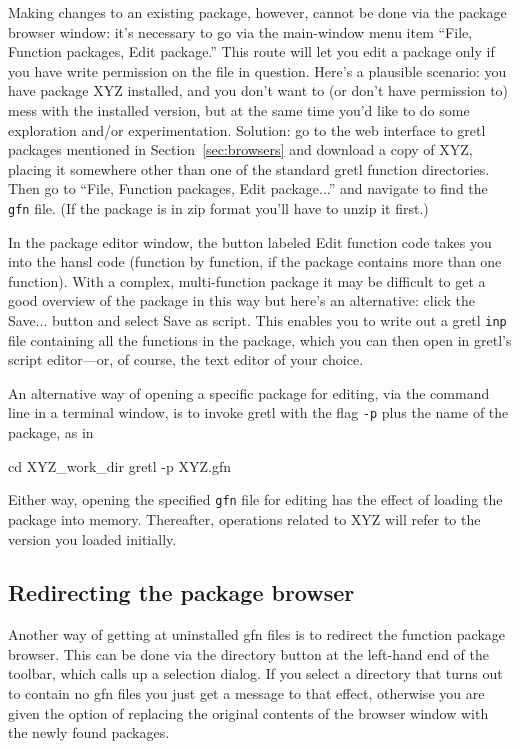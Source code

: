 \documentclass[oneside]{book}
\begin{document}
Making changes to an existing package, however, cannot be done via the
package browser window: it's necessary to go via the main-window menu
item ``File, Function packages, Edit package.'' This route will let
you edit a package only if you have write permission on the file in
question.  Here's a plausible scenario: you have package \textsf{XYZ}
installed, and you don't want to (or don't have permission to) mess
with the installed version, but at the same time you'd like to do some
exploration and/or experimentation. Solution: go to the web interface
to gretl packages mentioned in Section~\ref{sec:browsers} and download
a copy of \textsf{XYZ}, placing it somewhere other than one of the
standard gretl function directories. Then go to ``File, Function
packages, Edit package...'' and navigate to find the \texttt{gfn}
file. (If the package is in zip format you'll have to unzip it first.)

In the package editor window, the button labeled \textsf{Edit function
  code} takes you into the hansl code (function by function, if the
package contains more than one function). With a complex,
multi-function package it may be difficult to get a good overview of
the package in this way but here's an alternative: click the
\textsf{Save...} button and select \textsf{Save as script}. This
enables you to write out a gretl \texttt{inp} file containing all the
functions in the package, which you can then open in gretl's script
editor---or, of course, the text editor of your choice.

An alternative way of opening a specific package for editing, via the
command line in a terminal window, is to invoke gretl with the flag
\texttt{-p} plus the name of the package, as in
%
\begin{code}
cd XYZ_work_dir
gretl -p XYZ.gfn
\end{code}
%
Either way, opening the specified \texttt{gfn} file for editing has
the effect of loading the package into memory. Thereafter, operations
related to \textsf{XYZ} will refer to the version you loaded
initially.

\subsection{Redirecting the package browser}

Another way of getting at uninstalled \textsf{gfn} files is to
redirect the function package browser. This can be done via the
directory button at the left-hand end of the toolbar, which calls up a
selection dialog. If you select a directory that turns out to contain
no \textsf{gfn} files you just get a message to that effect, otherwise
you are given the option of replacing the original contents of the
browser window with the newly found packages.
\end{document}
